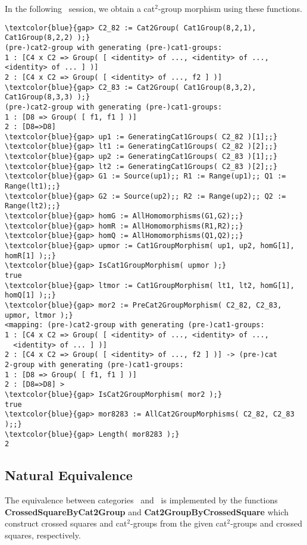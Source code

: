 \documentclass[a4paper,11pt]{article}
\theoremstyle{plain}
\theoremstyle{definition}
\begin{document}
In the following \GAP\ session, we obtain a cat$^{2}$-group morphism
using these functions.

\begin{Verbatim}[frame=single, fontsize=\small, commandchars=\\\{\}]
\textcolor{blue}{gap> C2_82 := Cat2Group( Cat1Group(8,2,1), Cat1Group(8,2,2) );}
(pre-)cat2-group with generating (pre-)cat1-groups:
1 : [C4 x C2 => Group( [ <identity> of ..., <identity> of ...,
<identity> of ... ] )]
2 : [C4 x C2 => Group( [ <identity> of ..., f2 ] )]
\textcolor{blue}{gap> C2_83 := Cat2Group( Cat1Group(8,3,2), Cat1Group(8,3,3) );}
(pre-)cat2-group with generating (pre-)cat1-groups:
1 : [D8 => Group( [ f1, f1 ] )]
2 : [D8=>D8]
\textcolor{blue}{gap> up1 := GeneratingCat1Groups( C2_82 )[1];;}
\textcolor{blue}{gap> lt1 := GeneratingCat1Groups( C2_82 )[2];;}
\textcolor{blue}{gap> up2 := GeneratingCat1Groups( C2_83 )[1];;}
\textcolor{blue}{gap> lt2 := GeneratingCat1Groups( C2_83 )[2];;}
\textcolor{blue}{gap> G1 := Source(up1);; R1 := Range(up1);; Q1 := Range(lt1);;}
\textcolor{blue}{gap> G2 := Source(up2);; R2 := Range(up2);; Q2 := Range(lt2);;}
\textcolor{blue}{gap> homG := AllHomomorphisms(G1,G2);;}
\textcolor{blue}{gap> homR := AllHomomorphisms(R1,R2);;}
\textcolor{blue}{gap> homQ := AllHomomorphisms(Q1,Q2);;}
\textcolor{blue}{gap> upmor := Cat1GroupMorphism( up1, up2, homG[1], homR[1] );;}
\textcolor{blue}{gap> IsCat1GroupMorphism( upmor );}
true
\textcolor{blue}{gap> ltmor := Cat1GroupMorphism( lt1, lt2, homG[1], homQ[1] );;}
\textcolor{blue}{gap> mor2 := PreCat2GroupMorphism( C2_82, C2_83, upmor, ltmor );}
<mapping: (pre-)cat2-group with generating (pre-)cat1-groups:
1 : [C4 x C2 => Group( [ <identity> of ..., <identity> of ..., 
  <identity> of ... ] )]
2 : [C4 x C2 => Group( [ <identity> of ..., f2 ] )] -> (pre-)cat
2-group with generating (pre-)cat1-groups:
1 : [D8 => Group( [ f1, f1 ] )]
2 : [D8=>D8] >
\textcolor{blue}{gap> IsCat2GroupMorphism( mor2 );}
true
\textcolor{blue}{gap> mor8283 := AllCat2GroupMorphisms( C2_82, C2_83 );;}
\textcolor{blue}{gap> Length( mor8283 );}
2
\end{Verbatim}


\subsection{Natural Equivalence}

The equivalence between categories \catXSq\ and \catCatt\ 
is implemented by the functions 
\textbf{CrossedSquareByCat2Group} and \textbf{Cat2GroupByCrossedSquare} 
which construct crossed squares and cat$^{2}$-groups 
from the given cat$^{2}$-groups and crossed squares, respectively.
\end{document}
